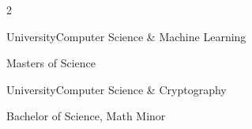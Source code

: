 \documentclass{article}
\newenvironment{*mylist}[2]{
  \subsection*{#1}
  \small
  \begin{list}{}{}
   \setlength{\topsep}{0pt}
   \setlength{\itemsep}{1pt}
   \setlength{\parskip}{0pt}
   \setlength{\parsep}{0pt}
 \item {\bf #2}
}{\end{list}\normalsize}
\newcommand{\LUx}[1]{{\bf\em #1}}
\begin{document}

\BSec{}

\begin{multicols}{2}

  \begin{*mylist}{ University}{Computer Science \& Machine Learning}
  \item Masters of Science %
\end{*mylist}\columnbreak

  \raggedright
  \begin{*mylist}{ University}{Computer Science \& Cryptography}
  \item Bachelor of Science, Math Minor %
  \end{*mylist}
\end{multicols}
\end{document}
